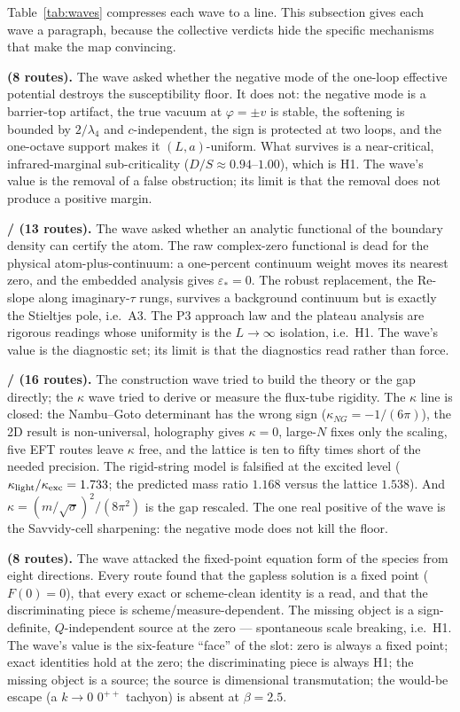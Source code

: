 Table~\ref{tab:waves} compresses each wave to a line. This subsection gives each wave a
paragraph, because the collective verdicts hide the specific mechanisms that make the map
convincing.

\textbf{ (8 routes).} The wave asked whether the negative mode of the one-loop
effective potential destroys the susceptibility floor. It does not: the negative mode is a
barrier-top artifact, the true vacuum at $\varphi=\pm v$ is stable, the softening is bounded by
$2/\lambda_4$ and $c$-independent, the sign is protected at two loops, and the one-octave support
makes it $(L,a)$-uniform. What survives is a near-critical, infrared-marginal sub-criticality
($D/S\approx0.94$--$1.00$), which is H1. The wave's value is the removal of a false obstruction;
its limit is that the removal does not produce a positive margin.

\textbf{/ (13 routes).} The wave asked whether an analytic functional of the
boundary density can certify the atom. The raw complex-zero functional is dead for the physical
atom-plus-continuum: a one-percent continuum weight moves its nearest zero, and the embedded
analysis gives $\varepsilon_*=0$. The robust replacement, the Re-slope along imaginary-$\tau$
rungs, survives a background continuum but is exactly the Stieltjes pole, i.e.\ A3. The P3
approach law and the plateau analysis are rigorous readings whose uniformity is the
$L\to\infty$ isolation, i.e.\ H1. The wave's value is the diagnostic set; its limit is that the
diagnostics read rather than force.

\textbf{/ (16 routes).} The construction wave tried to build the
theory or the gap directly; the $\kappa$ wave tried to derive or measure the flux-tube rigidity.
The $\kappa$ line is closed: the Nambu--Goto determinant has the wrong sign
($\kappa_{NG}=-1/(6\pi)$), the 2D result is non-universal, holography gives $\kappa=0$, large-$N$
fixes only the scaling, five EFT routes leave $\kappa$ free, and the lattice is ten to fifty
times short of the needed precision. The rigid-string model is falsified at the excited level
($\kappa_{\rm light}/\kappa_{\rm exc}=1.733$; the predicted mass ratio $1.168$ versus the lattice
$1.538$). And $\kappa=(m/\sqrt\sigma)^2/(8\pi^2)$ is the gap rescaled. The one real positive of
the wave is the Savvidy-cell sharpening: the negative mode does not kill the floor.

\textbf{ (8 routes).} The wave attacked the fixed-point equation form of the species
from eight directions. Every route found that the gapless solution is a fixed point
($F(0)=0$), that every exact or scheme-clean identity is a read, and that the discriminating
piece is scheme/measure-dependent. The missing object is a sign-definite, $Q$-independent source
at the zero --- spontaneous scale breaking, i.e.\ H1. The wave's value is the six-feature ``face''
of the slot: zero is always a fixed point; exact identities hold at the zero; the discriminating
piece is always H1; the missing object is a source; the source is dimensional transmutation; the
would-be escape (a $k\to0$ $0^{++}$ tachyon) is absent at $\beta=2.5$.


